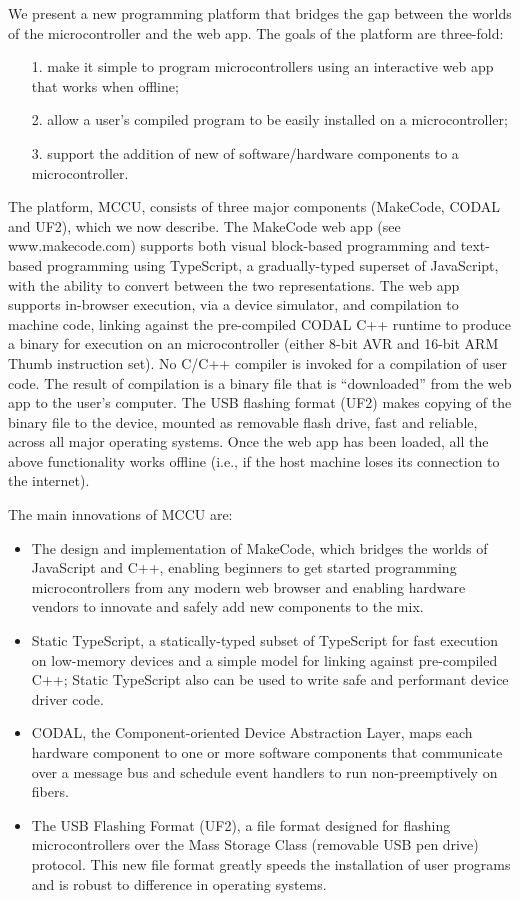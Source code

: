We present a new programming platform that bridges the gap between the worlds of the microcontroller and the web app. 
The goals of the platform are three-fold:
\begin{itemize}
\item[1.] make it simple to program microcontrollers using an interactive web app that works when offline;
\item[2.] allow a user’s compiled program to be easily installed on a microcontroller;
\item[3.] support the addition of new of software/hardware components to a microcontroller.
\end{itemize}
The platform, MCCU, consists of three major components (MakeCode, CODAL and UF2), which we now describe. 
The MakeCode web app (see www.makecode.com) supports both visual block-based programming and text-based programming 
using TypeScript, a gradually-typed superset of JavaScript, with the ability to convert between the two representations. 
The web app supports in-browser execution, via a device simulator, and compilation to machine code, linking against the 
pre-compiled CODAL C++ runtime to produce a binary for execution on an microcontroller (either 8-bit AVR and 16-bit ARM 
Thumb instruction set). No C/C++ compiler is invoked for a compilation of user code. The result of compilation is a 
binary file that is “downloaded” from the web app to the user’s computer. The USB flashing format (UF2) makes copying 
of the binary file to the device, mounted as removable flash drive, fast and reliable, across all major operating systems. 
Once the web app has been loaded, all the above functionality works offline (i.e., if the host machine loses its connection 
to the internet).

The main innovations of MCCU are:
\begin{itemize}
\item The design and implementation of MakeCode, which bridges the worlds of JavaScript and C++, 
      enabling beginners to get started programming microcontrollers from any modern web browser and enabling 
      hardware vendors to innovate and safely add new components to the mix. 
\item Static TypeScript, a statically-typed subset of TypeScript for fast execution on low-memory devices and a simple model for linking against pre-compiled C++; Static TypeScript also can be used to write safe and performant device driver code.
\item CODAL, the Component-oriented Device Abstraction Layer, maps each hardware component to one or more software components that communicate over a message bus and schedule event handlers to run non-preemptively on fibers. 
\item The USB Flashing Format (UF2), a file format designed for flashing microcontrollers over the Mass Storage Class (removable USB pen drive) protocol.  This new file format greatly speeds the installation of user programs and is robust to difference in operating systems.
\end{itemize}


